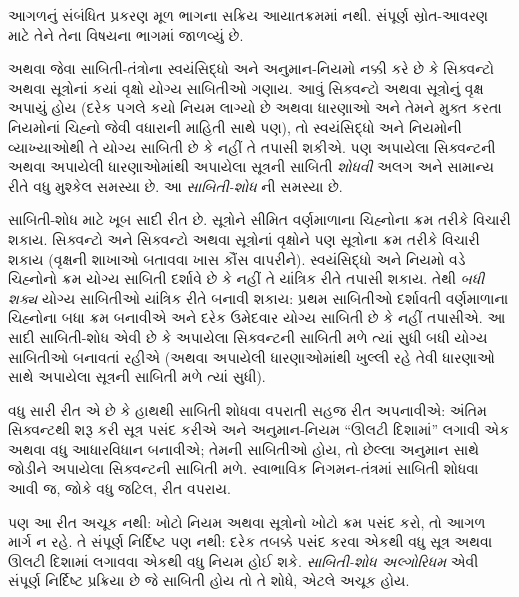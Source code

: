 \OLEndPartHook


\begin{editorial}
આગળનું સંબંધિત પ્રકરણ મૂળ ભાગના સક્રિય આયાતક્રમમાં નથી. સંપૂર્ણ સ્રોત-આવરણ માટે તેને તેના વિષયના ભાગમાં જાળવ્યું છે.
\end{editorial}
\begingroup
\makeatletter{}\makeatother

\label{guunit:OLP-0681}


\begingroup
\makeatletter{}\makeatother


\label{guunit:OLP-0680}


 અથવા
 જેવા
સાબિતી-તંત્રોના
સ્વયંસિદ્ધો અને
અનુમાન-નિયમો
નક્કી કરે છે
કે સિક્વન્ટો
અથવા સૂત્રોનાં
કયાં વૃક્ષો
યોગ્ય સાબિતીઓ
ગણાય. આવું
સિક્વન્ટો અથવા
સૂત્રોનું
વૃક્ષ અપાયું
હોય (દરેક
પગલે કયો નિયમ
લાગ્યો છે
અથવા ધારણાઓ
અને તેમને
મુક્ત કરતા
નિયમોનાં
ચિહ્નો જેવી
વધારાની માહિતી
સાથે પણ),
તો સ્વયંસિદ્ધો
અને નિયમોની
વ્યાખ્યાઓથી
તે યોગ્ય
સાબિતી છે
કે નહીં તે
તપાસી શકીએ.
પણ અપાયેલા
સિક્વન્ટની
અથવા અપાયેલી
ધારણાઓમાંથી
અપાયેલા
સૂત્રની
સાબિતી
\emph{શોધવી}
અલગ અને
સામાન્ય રીતે
વધુ મુશ્કેલ
સમસ્યા છે.
આ \emph{સાબિતી-શોધ}
ની સમસ્યા છે.

સાબિતી-શોધ માટે
ખૂબ સાદી
રીત છે.
સૂત્રોને
સીમિત વર્ણમાળાના
ચિહ્નોના ક્રમ
તરીકે વિચારી
શકાય. સિક્વન્ટો
અને સિક્વન્ટો
અથવા
સૂત્રોનાં
વૃક્ષોને પણ
સૂત્રોના
ક્રમ તરીકે
વિચારી શકાય
(વૃક્ષની શાખાઓ
બતાવવા ખાસ
કૌંસ વાપરીને).
સ્વયંસિદ્ધો
અને નિયમો
વડે ચિહ્નોનો
ક્રમ યોગ્ય
સાબિતી
દર્શાવે છે
કે નહીં તે
યાંત્રિક રીતે
તપાસી શકાય.
તેથી \emph{બધી
શક્ય} યોગ્ય
સાબિતીઓ
યાંત્રિક રીતે
બનાવી શકાય:
પ્રથમ સાબિતીઓ
દર્શાવતી
વર્ણમાળાના
ચિહ્નોના બધા
ક્રમ બનાવીએ
અને દરેક
ઉમેદવાર યોગ્ય
સાબિતી છે
કે નહીં તપાસીએ.
આ સાદી
સાબિતી-શોધ
એવી છે કે
અપાયેલા સિક્વન્ટની
સાબિતી મળે
ત્યાં સુધી
બધી યોગ્ય
સાબિતીઓ
બનાવતાં રહીએ
(અથવા અપાયેલી
ધારણાઓમાંથી
ખુલ્લી રહે
તેવી ધારણાઓ
સાથે અપાયેલા
સૂત્રની
સાબિતી મળે
ત્યાં સુધી).

વધુ સારી
રીત એ છે
કે હાથથી
સાબિતી
શોધવા વપરાતી
સહજ રીત
અપનાવીએ:
અંતિમ સિક્વન્ટથી
શરૂ કરી
સૂત્ર
પસંદ કરીએ
અને અનુમાન-નિયમ
``ઊલટી દિશામાં''
લગાવી એક
અથવા વધુ
આધારવિધાન
બનાવીએ; તેમની
સાબિતીઓ
હોય, તો
છેલ્લા અનુમાન
સાથે જોડીને
અપાયેલા સિક્વન્ટની
સાબિતી
મળે. સ્વાભાવિક
નિગમન-તંત્રમાં
સાબિતી
શોધવા આવી
જ, જોકે
વધુ જટિલ,
રીત વપરાય.

પણ આ રીત
અચૂક નથી:
ખોટો નિયમ
અથવા
સૂત્રોનો
ખોટો ક્રમ
પસંદ કરો,
તો આગળ
માર્ગ ન
રહે. તે
સંપૂર્ણ નિર્દિષ્ટ
પણ નથી:
દરેક તબક્કે
પસંદ કરવા
એકથી વધુ
સૂત્ર
અથવા ઊલટી
દિશામાં
લગાવવા એકથી
વધુ નિયમ
હોઈ શકે.
\emph{સાબિતી-શોધ
અલ્ગોરિધમ}
એવી સંપૂર્ણ
નિર્દિષ્ટ
પ્રક્રિયા છે
જે સાબિતી
હોય તો
તે શોધે,
એટલે અચૂક
હોય.


